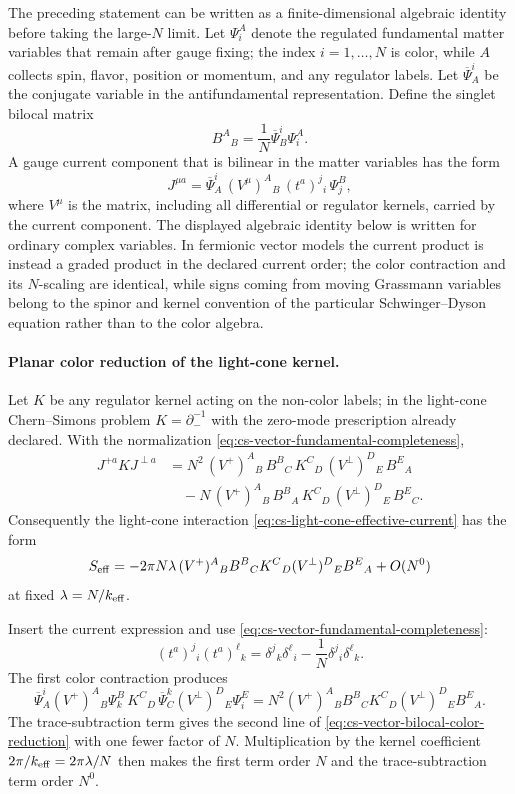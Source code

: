 The preceding statement can be written as a finite-dimensional algebraic
identity before taking the large-\(N\) limit.  Let \(\Psi_i^A\) denote the
regulated fundamental matter variables that remain after gauge fixing; the
index \(i=1,\ldots,N\) is color, while \(A\) collects spin, flavor, position
or momentum, and any regulator labels.  Let \(\overline\Psi_A^i\) be the
conjugate variable in the antifundamental representation.  Define the singlet
bilocal matrix
\begin{equation}
  B^A{}_{B}
  =
  \frac1N\overline\Psi^i_B\Psi_i^A .
  \label{eq:cs-vector-bilocal-singlet}
\end{equation}
A gauge current component that is bilinear in the matter variables has the
form
\[
  J^{\mu a}
  =
  \overline\Psi^i_A\,(V^\mu)^A{}_{B}\,(t^a)^j{}_{i}\,\Psi_j^B ,
\]
where \(V^\mu\) is the matrix, including all differential or regulator
kernels, carried by the current component.  The displayed algebraic identity
below is written for ordinary complex variables.  In fermionic vector models
the current product is instead a graded product in the declared current order;
the color contraction and its \(N\)-scaling are identical, while signs coming
from moving Grassmann variables belong to the spinor and kernel convention of
the particular Schwinger--Dyson equation rather than to the color algebra.

\paragraph{Planar color reduction of the light-cone kernel.}
Let \(K\) be any regulator kernel acting on the non-color labels; in the
light-cone Chern--Simons problem \(K=\partial_-^{-1}\) with the zero-mode
prescription already declared.  With the normalization
\eqref{eq:cs-vector-fundamental-completeness},
\begin{align}
  J^{+a}KJ^{\perp a}
  &=
  N^2\,
  (V^+)^A{}_{B}\,B^B{}_{C}\,
  K^C{}_{D}\,
  (V^\perp)^D{}_{E}\,B^E{}_{A}
  \nonumber\\
  &\quad
  -N\,
  (V^+)^A{}_{B}\,B^B{}_{A}\,
  K^C{}_{D}\,
  (V^\perp)^D{}_{E}\,B^E{}_{C}.
  \label{eq:cs-vector-bilocal-color-reduction}
\end{align}
Consequently the light-cone interaction
\eqref{eq:cs-light-cone-effective-current} has the form
\[
  S_{\rm eff}
  =
  -2\pi N\lambda\,
  (V^+)^A{}_{B}B^B{}_{C}K^C{}_{D}(V^\perp)^D{}_{E}B^E{}_{A}
  +
  O(N^0)
\]
at fixed \(\lambda=N/k_{\rm eff}\).

Insert the current expression and use
\eqref{eq:cs-vector-fundamental-completeness}:
\[
  (t^a)^j{}_{i}(t^a)^\ell{}_{k}
  =
  \delta^j{}_{k}\delta^\ell{}_{i}
  -
  \frac1N\delta^j{}_{i}\delta^\ell{}_{k}.
\]
The first color contraction produces
\[
  \overline\Psi^i_A(V^+)^A{}_{B}\Psi_k^B\,
  K^C{}_{D}\,
  \overline\Psi^k_C(V^\perp)^D{}_{E}\Psi_i^E
  =
  N^2
  (V^+)^A{}_{B}B^B{}_{C}K^C{}_{D}(V^\perp)^D{}_{E}B^E{}_{A}.
\]
The trace-subtraction term gives the second line of
\eqref{eq:cs-vector-bilocal-color-reduction} with one fewer factor of \(N\).
Multiplication by the kernel coefficient \(2\pi/k_{\rm eff}=2\pi\lambda/N\)
then makes the first term order \(N\) and the trace-subtraction term order
\(N^0\).


